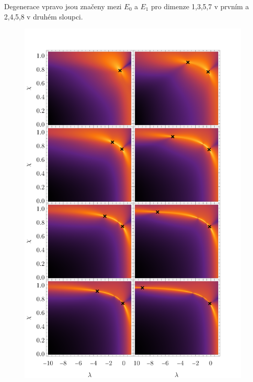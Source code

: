 \documentclass{beamer}
\begin{document}
{\begin{minipage}[t]{0.48\linewidth}
      Degenerace vpravo jsou značeny mezi $E_0$ a $E_1$ pro dimenze 1,3,5,7 v prvním a 2,4,5,8 v druhém sloupci.
  \end{minipage}%
  \begin{minipage}[t]{0.48\linewidth}
    \begin{figure}[h]
      \centering
      \vspace{-50pt}\includegraphics[scale=0.59]{../dp_text/img/singularitiesPlots.pdf}
     
  \end{figure}
  \end{minipage}


  
}
\end{document}
